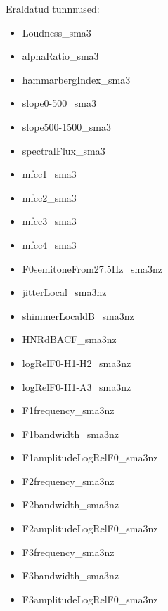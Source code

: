 Eraldatud tunnnused:
\begin{itemize}
    \item Loudness\_sma3
    \item alphaRatio\_sma3
    \item hammarbergIndex\_sma3
    \item slope0-500\_sma3
    \item slope500-1500\_sma3
    \item spectralFlux\_sma3
    \item mfcc1\_sma3
    \item mfcc2\_sma3
    \item mfcc3\_sma3
    \item mfcc4\_sma3
    \item F0semitoneFrom27.5Hz\_sma3nz
    \item jitterLocal\_sma3nz
    \item shimmerLocaldB\_sma3nz
    \item HNRdBACF\_sma3nz
    \item logRelF0-H1-H2\_sma3nz
    \item logRelF0-H1-A3\_sma3nz
    \item F1frequency\_sma3nz
    \item F1bandwidth\_sma3nz
    \item F1amplitudeLogRelF0\_sma3nz
    \item F2frequency\_sma3nz
    \item F2bandwidth\_sma3nz
    \item F2amplitudeLogRelF0\_sma3nz
    \item F3frequency\_sma3nz
    \item F3bandwidth\_sma3nz
    \item F3amplitudeLogRelF0\_sma3nz
\end{itemize}

